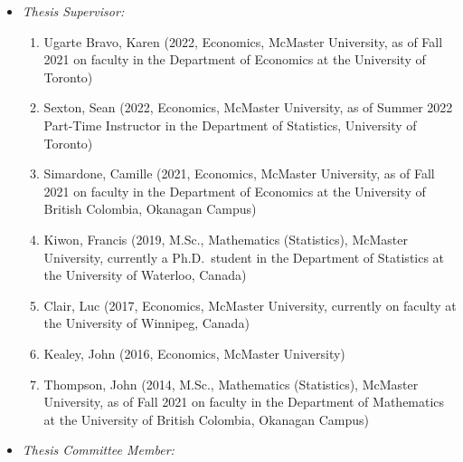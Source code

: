 \documentclass[
]{article}
\begin{document}
\begin{itemize}
\item
  \emph{Thesis Supervisor:}

  \begin{enumerate}
  \def\labelenumi{\arabic{enumi}.}
  \item
    Ugarte Bravo, Karen (2022, Economics, McMaster University, as of
    Fall 2021 on faculty in the Department of Economics at the
    University of Toronto)
  \item
    Sexton, Sean (2022, Economics, McMaster University, as of Summer
    2022 Part-Time Instructor in the Department of Statistics,
    University of Toronto)
  \item
    Simardone, Camille (2021, Economics, McMaster University, as of Fall
    2021 on faculty in the Department of Economics at the University of
    British Colombia, Okanagan Campus)
  \item
    Kiwon, Francis (2019, M.Sc., Mathematics (Statistics), McMaster
    University, currently a Ph.D.~student in the Department of
    Statistics at the University of Waterloo, Canada)
  \item
    Clair, Luc (2017, Economics, McMaster University, currently on
    faculty at the University of Winnipeg, Canada)
  \item
    Kealey, John (2016, Economics, McMaster University)
  \item
    Thompson, John (2014, M.Sc., Mathematics (Statistics), McMaster
    University, as of Fall 2021 on faculty in the Department of
    Mathematics at the University of British Colombia, Okanagan Campus)
  \end{enumerate}
\item
  \emph{Thesis Committee Member:}


\end{itemize}
\end{document}
